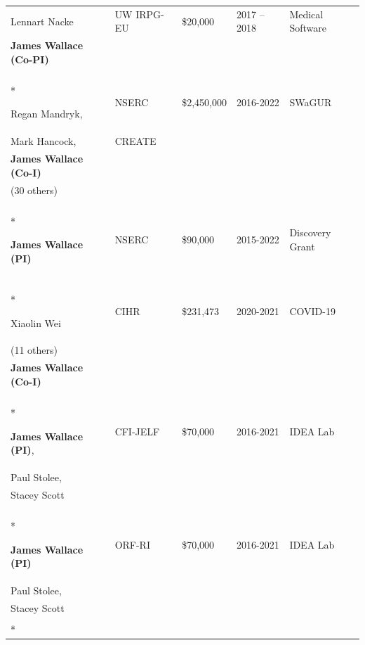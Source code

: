 \documentclass[12pt]{article}
\begin{document}
\begin{longtable}[c]{p{4.5cm} l l l p{4.5cm}}
Lennart Nacke & UW IRPG-EU & \$20,000 & 2017 -- 2018 & Medical Software \\
\textbf{James Wallace (Co-PI)} \\
\\*


Regan Mandryk,            & NSERC       & \$2,450,000 & 2016-2022 & SWaGUR                    \\
Mark Hancock,             & CREATE      &             &           &                           \\
\textbf{James Wallace (Co-I)}   &             &             &           &                           \\
(30 others) & & & & \\
\\*


\textbf{James Wallace (PI)}             & NSERC       & \$90,000    & 2015-2022 & Discovery Grant           \\
\\*


Xiaolin Wei &   CIHR & \$231,473 & 2020-2021 & COVID-19 \\
(11 others) \\
\textbf{James Wallace (Co-I)} \\
\\*

\textbf{James Wallace (PI)},              & CFI-JELF    & \$70,000    & 2016-2021 & IDEA Lab                  \\
Paul Stolee, \\ Stacey Scott \\
\\*

\textbf{James Wallace (PI)}             & ORF-RI      & \$70,000    & 2016-2021 & IDEA Lab                  \\
Paul Stolee, \\ Stacey Scott \\
\\*



\end{longtable}
\end{document}
